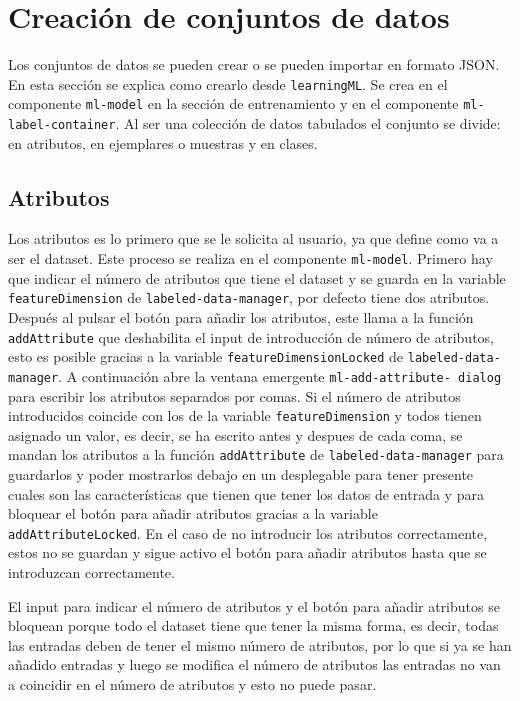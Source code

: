 \documentclass[a4paper, 12pt]{book}
\begin{document}
\section{Creación de conjuntos de datos} 
\label{sec:crear conjunto de datos}

Los conjuntos de datos se pueden crear o se pueden importar en formato JSON. En esta sección se explica como crearlo desde \texttt{learningML}. 
Se crea en el componente \texttt{ml-model} en la sección de entrenamiento y en el componente \texttt{ml-label-container}. 
Al ser una colección de datos tabulados el conjunto se divide: en atributos, en ejemplares o muestras y en clases. 

\subsection{Atributos}
\label{subsec:atributos}

Los atributos es lo primero que se le solicita al usuario, ya que define como va a ser el dataset. 
Este proceso se realiza en el componente \texttt{ml-model}. 
Primero hay que indicar el número de atributos que tiene el dataset y se guarda en la variable \texttt{featureDimension} de \texttt{labeled-data-manager}, por defecto tiene dos atributos. 
Después al pulsar el botón para añadir los atributos, este llama a la función \texttt{addAttribute} que deshabilita el input de introducción de número de atributos, esto es posible gracias a la variable \texttt{featureDimensionLocked} de \texttt{labeled-data-manager}.
A continuación abre la ventana emergente \texttt{ml-add-attribute-
dialog} para escribir los atributos separados por comas. 
Si el número de atributos introducidos coincide con los de la variable \texttt{featureDimension} y todos tienen asignado un valor, es decir, se ha escrito antes y despues de cada coma, se mandan los atributos a la función \texttt{addAttribute} de \texttt{labeled-data-manager} para guardarlos y poder mostrarlos debajo en un desplegable para tener presente cuales son las características que tienen que tener los datos de entrada y para bloquear el botón para añadir atributos gracias a la variable \texttt{addAttributeLocked}. 
En el caso de no introducir los atributos correctamente, estos no se guardan y sigue activo el botón para añadir atributos hasta que se introduzcan correctamente.

El input para indicar el número de atributos y el botón para añadir atributos se bloquean porque todo el dataset tiene que tener la misma forma, es decir, todas las entradas deben de tener el mismo número de atributos, por lo que si ya se han añadido entradas y luego se modifica el número de atributos las entradas no van a coincidir en el número de atributos y esto no puede pasar.
\end{document}
